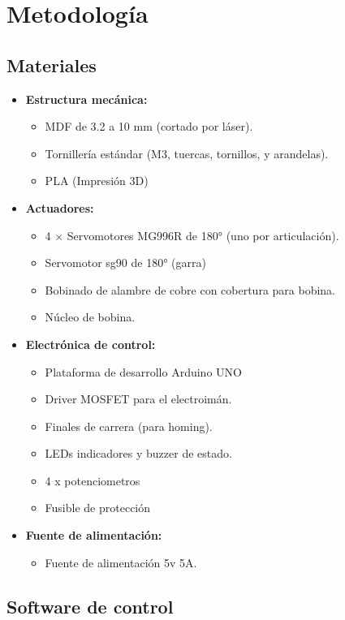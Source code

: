 \section{Metodología}
\subsection{Materiales}

\begin{itemize}
  \item \textbf{Estructura mecánica:} \begin{itemize}
    \item MDF de 3.2 a 10 mm (cortado por láser).
    \item Tornillería estándar (M3, tuercas, tornillos, y arandelas).
    \item PLA (Impresión 3D)
  \end{itemize}

  \item \textbf{Actuadores:}
  \begin{itemize}
    \item 4 × Servomotores MG996R de 180° (uno por articulación).
    \item Servomotor sg90 de 180° (garra)
    \item Bobinado de alambre de cobre con cobertura para bobina.
    \item Núcleo de bobina.
  \end{itemize}

  \item \textbf{Electrónica de control:}
  \begin{itemize}
    \item Plataforma de desarrollo Arduino UNO
    \item Driver MOSFET para el electroimán.
    \item Finales de carrera (para homing).
    \item LEDs indicadores y buzzer de estado.
    \item 4 x potenciometros
    \item Fusible de protección 
  \end{itemize}

  \item \textbf{Fuente de alimentación:}
  \begin{itemize}
    \item Fuente de alimentación 5v 5A.
  \end{itemize}
\end{itemize}
\subsection{Software de control}

